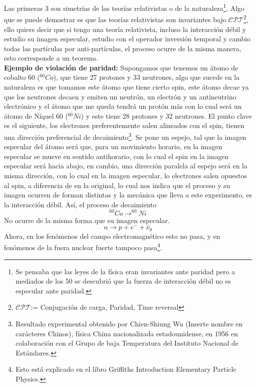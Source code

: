 \documentclass[../main.tex]{subfiles}
\begin{document}
Las primeras 3 son simetrías de las teorías relativistas o de la naturaleza\footnote{ Se pensaba que las leyes de la física eran invariantes ante paridad pero a mediados de los 50 se descubrió que la fuerza de interacción débil no es especular ante paridad.}. 
Algo que se puede demostrar es que las teorías relativistas son invariantes bajo $\mathcal{CPT}$\footnote{$\mathcal{CPT}$:= Conjugación de carga, Paridad, Time reversal}, ello quiere decir que si tengo una teoría relativista, incluso la interacción débil y estudio su imagen especular, estudio con el operador inversión temporal y cambio todas las partículas por anti-partículas, el proceso ocurre de la misma manera, esto corresponde a un teorema.\\
\textbf{Ejemplo de violación de paridad:} Supongamos que tenemos un átomo de cobalto 60 ($^{60}Co$), que tiene 27 protones y 33 neutrones, algo que sucede en la naturaleza es que tomamos este átomo que tiene cierto spin, este átomo decae ya que los neutrones decaen y emiten un neutrón, un electrón y un antineutrino electrónico y el átomo que me queda tendrá un protón más con lo cual será un átomo de Níquel 60 ($^{60}Ni$) y este tiene 28 protones y 32 neutrones. El punto clave es el siguiente, los electrones preferentemente salen alineados con el spin, tienen una dirección preferencial de decaimiento\footnote{Resultado experimental obtenido por Chien-Shiung Wu (Inserte nombre en carácteres Chinos), física China nacionalizada estadounidense, en 1956 en colaboración con el Grupo de baja Temperatura del Instituto Nacional de Estándares. }. Se pone un espejo, tal que la imagen especular del átomo será que, para un movimiento horario, en la imagen especular se mueve en sentido antihorario, con lo cual el spin en la imagen especular será hacia abajo, en cambio, una dirección paralela al espejo será en la misma dirección, con lo cual en la imagen especular, lo electrones salen opuestos al spin, a diferencia de en la original, lo cual nos indica que el proceso y su imagen ocurren de forman distintas y la mecánica que lleva a este experimento, es la interacción débil. Así, el proceso de decaimiento
\begin{equation}
  ^{60}Co \longrightarrow ^{60}Ni
 \end{equation}
No ocurre de la misma forma que su imagen especular.
\begin{equation}
  n\longrightarrow p+e^-+\bar{\nu}_\theta
 \end{equation}
 Ahora, en los fenómenos del campo electromagnético esto no pasa, y en fenómenos de la fuera nuclear fuerte tampoco pasa\footnote{Esto está explicado en el libro Griffiths Introduction Elementary Particle Physics.}. \\
\end{document}
